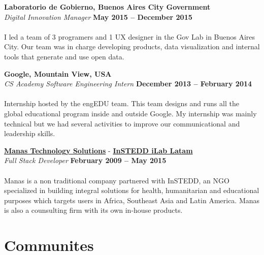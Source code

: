 \documentclass[margin,line]{resume}
\begin{document}
\begin{resume}
\textbf{Laboratorio de Gobierno, Buenos Aires City Government}\vspace{2mm}\\\vspace{1mm}
\textsl{Digital Innovation Manager} \hfill \textbf{May 2015 -- December 2015}\vspace{-3mm}\\\vspace{-1mm}
\\
I led a team of 3 programers and 1 UX designer in the Gov Lab in Buenos Aires City. Our team was in charge developing products, data visualization and internal tools that generate and use open data.


\textbf{Google, Mountain View, USA}\vspace{2mm}\\\vspace{1mm}
\textsl{CS Academy Software Engineering Intern} \hfill \textbf{December 2013 -- February 2014}\vspace{-3mm}\\\vspace{-1mm}
\\
Internship hosted by the engEDU team. This team designs and runs all the global educational program inside and outside Google. My internship was mainly technical but we had several activities to improve our communicational and leadership skills.

\textbf{\href{http://www.manas.com.ar/}{Manas Technology Solutions}} - 
\textbf{\href{http://www.instedd.org/}{InSTEDD iLab Latam}}\vspace{2mm}\\\vspace{1mm}
\textsl{Full Stack Developer} \hfill \textbf{February 2009 -- May 2015}\vspace{-3mm}\\\vspace{-1mm}
\\
Manas is a non traditional company partnered with InSTEDD, an NGO specialized in building integral solutions for health, humanitarian and educational purposes which targets users in Africa, Southeast Asia and Latin America. Manas is also a counsulting firm with its own in-house products.
\newpage


\section{\mysidestyle Communites}


\end{resume}
\end{document}

